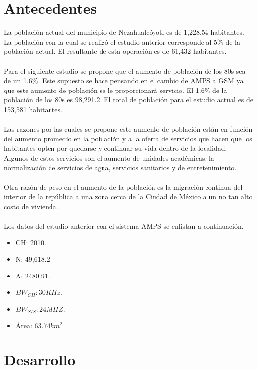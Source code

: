 \documentclass[11pt,letterpaper]{article}
\begin{document}


\newpage
\tableofcontents
\listoffigures
\listoftables

\newpage
\section{Antecedentes}
La población actual del municipio de Nezahualcóyotl es de 1,228,54 habitantes.
La población con la cual se realizó el estudio anterior corresponde al 5\% de 
la población actual. El resultante de esta operación es de 61,432 habitantes. 
\\ \\
Para el siguiente estudio se propone que el aumento de población de los 80s 
sea de un 1.6\%. Este supuesto se hace pensando en el cambio de AMPS a GSM ya 
que este aumento de población se le proporcionará servicio. El 1.6\% de la 
población de los 80s es 98,291.2. El total de población para el estudio actual 
es de 153,581 habitantes.
\\ \\
Las razones por las cuales se propone este aumento de población están en función 
del aumento promedio en la población y a la oferta de servicios que hacen que los 
habitantes opten por quedarse y continuar su vida dentro de la localidad. Algunos 
de estos servicios son el aumento de unidades académicas, la normalización de 
servicios de agua, servicios sanitarios y de entretenimiento. 
\\ \\
Otra razón de peso en el aumento de la población es la migración continua del 
interior de la república a una zona cerca de la Ciudad de México a un no tan alto 
costo de vivienda.
\\ \\
Los datos del estudio anterior con el sistema AMPS se enlistan a continuación.
\begin{itemize}
    \item CH: 2010.
    \item N: 49,618.2.
    \item A: 2480.91.
    \item $BW_{CH}:30KHz$.
    \item $BW_{SIS}:24MHZ$.
    \item Área: $63.74km^2$
\end{itemize}

\newpage
\section{Desarrollo}
\end{document}
